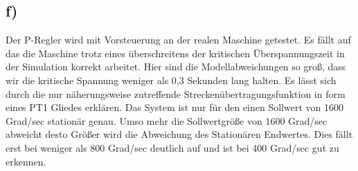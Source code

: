 \documentclass[10pt]{scrartcl}
\begin{document}
\subsection{f)}	Der P-Regler wird mit Vorsteuerung an der realen Maschine getestet. Es fällt auf das die Maschine trotz eines überschreitens der kritischen Überspannungszeit in der Simulation korrekt arbeitet. Hier sind die Modellabweichungen so groß, dass wir die kritische Spannung weniger als 0,3 Sekunden  lang halten. Es lässt sich durch die nur näherungsweise zutreffende Streckenübertragungsfunktion in form eines PT1 Gliedes erklären. Das System ist nur für den einen Sollwert von 1600 Grad/sec stationär genau. Umso mehr die Sollwertgröße von 1600 Grad/sec abweicht desto Größer wird die Abweichung des Stationären Endwertes. Dies fällt erst bei weniger als 800 Grad/sec deutlich auf und ist bei 400 Grad/sec gut zu erkennen.
\end{document}
